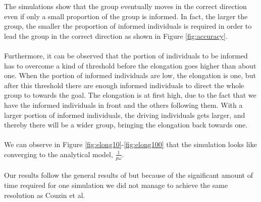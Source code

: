 The simulations show that the group eventually moves in the correct direction even if only a small proportion of the group is informed. 
In fact, the larger the group, the smaller the proportion of informed individuals is required in order to lead the group in the correct direction as shown in Figure \ref{fig:accuracy}.
\\\\
Furthermore, it can be observed that the portion of individuals to be informed has to overcome a kind of threshold before the elongation goes higher than about one. 
When the portion of informed individuals are low, the elongation is one, but after this threshold there are enough informed individuals to direct the whole group to towards the goal. 
The elongation is at first high, due to the fact that we have the informed individuals in front and the others following them. 
With a larger portion of informed individuals, the driving individuals gets larger, and thereby there will be a wider group, bringing the elongation back towards one.
\\\\
We can observe in Figure \ref{fig:elong10}-\ref{fig:elong100} that the simulation looks like converging to the analytical model, $\frac{1}{p\omega}$.
\\\\
Our results follow the general results of \cite{theArticle} but because of the significant amount of time required for one simulation we did not manage to achieve the same resolution as Couzin et al.